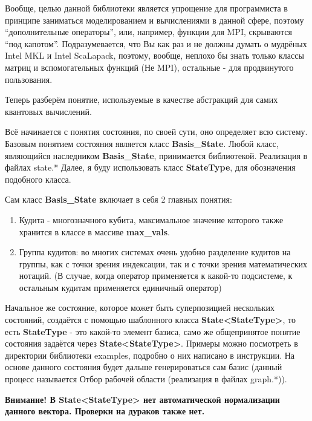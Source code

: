 \documentclass[12pt,fleqn]{article}
\begin{document}
        Вообще, целью данной библиотеки является упрощение для программиста в принципе заниматься моделированием и вычислениями в данной сфере, 
        поэтому ``дополнительные операторы'', или, например, функции для MPI, скрываются ``под капотом''. Подразумевается, что Вы как раз и не должны
        думать о мудрёных \textsf{Intel MKL} и \textsf{Intel ScaLapack}, поэтому, вообще, неплохо бы знать только классы матриц и вспомогательных функций (Не MPI),
        остальные - для продвинутого пользования.

        Теперь разберём понятие, используемые в качестве абстракций для самих квантовых вычислений.

        Всё начинается с понятия состояния, по своей сути, оно определяет всю систему.
        Базовым понятием состояния является класс \textbf{Basis\_State}.
        Любой класс, являющийся наследником \textbf{Basis\_State}, принимается библиотекой. Реализация в файлах \textsf{state.*}
        Далее, я буду использовать класс \textbf{StateType}, для обозначения подобного класса.

        Сам класс \textbf{Basis\_State} включает в себя 2 главных понятия:
        \begin{enumerate}
            \item{Кудита - многозначного кубита, максимальное значение которого 
        также хранится в классе в массиве \textbf{max\_vals}.}
            \item{Группа кудитов: во многих системах очень удобно разделение кудитов на группы, как с точки зрения индексации, так и 
            с точки зрения математических нотаций. (В случае, когда оператор применяется к какой-то подсистеме, к остальным кудитам 
            применяется единичный оператор)}
        \end{enumerate}

        Начальное же состояние, которое может быть суперпозицией нескольких состояний, создаётся с помощью шаблонного класса 
        \textbf{State<StateType>}, то есть \textbf{StateType} - это какой-то элемент базиса, само 
        же общепринятое понятие состояния задаётся через \newline \textbf{State<StateType>}. 
        Примеры можно посмотреть в директории библиотеки \textsf{examples}, подробно о них написано в инструкции. На основе данного состояния будет дальше 
        генерироваться сам базис (данный процесс называется \textsf{Отбор рабочей области} (реализация в файлах \textsf{graph.*})).
        
        \textbf{Внимание! В State<StateType> нет автоматической нормализации данного вектора. Проверки на дураков также нет.}
\end{document}
